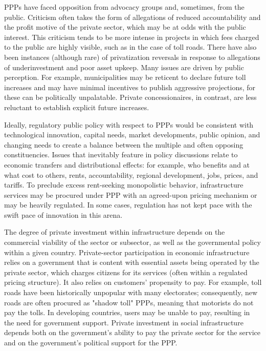 \documentclass[11pt]{article}
\begin{document}
PPPs have faced opposition from advocacy groups and, sometimes, from the public. Criticism often takes the form of allegations of reduced accountability and the profit motive of the private sector, which may be at odds with the public interest. This criticism tends to be more intense in projects in which fees charged to the public are highly visible, such as in the case of toll roads. There have also been instances (although rare) of privatization reversals in response to allegations of underinvestment and poor asset upkeep. Many issues are driven by public perception. For example, municipalities may be reticent to declare future toll increases and may have minimal incentives to publish aggressive projections, for these can be politically unpalatable. Private concessionaires, in contrast, are less reluctant to establish explicit future increases.

Ideally, regulatory public policy with respect to PPPs would be consistent with technological innovation, capital needs, market developments, public opinion, and changing needs to create a balance between the multiple and often opposing constituencies. Issues that inevitably feature in policy discussions relate to economic transfers and distributional effects: for example, who benefits and at what cost to others, rents, accountability, regional development, jobs, prices, and tariffs. To preclude excess rent-seeking monopolistic behavior, infrastructure services may be procured under PPP with an agreed-upon pricing mechanism or may be heavily regulated. In some cases, regulation has not kept pace with the swift pace of innovation in this arena.

The degree of private investment within infrastructure depends on the commercial viability of the sector or subsector, as well as the governmental policy within a given country. Private-sector participation in economic infrastructure relies on a government that is content with essential assets being operated by the private sector, which charges citizens for its services (often within a regulated pricing structure). It also relies on customers' propensity to pay. For example, toll roads have been historically unpopular with many electorates; consequently, new roads are often procured as "shadow toll" PPPs, meaning that motorists do not pay the tolls. In developing countries, users may be unable to pay, resulting in the need for government support. Private investment in social infrastructure depends both on the government's ability to pay the private sector for the service and on the government's political support for the PPP.
\end{document}
